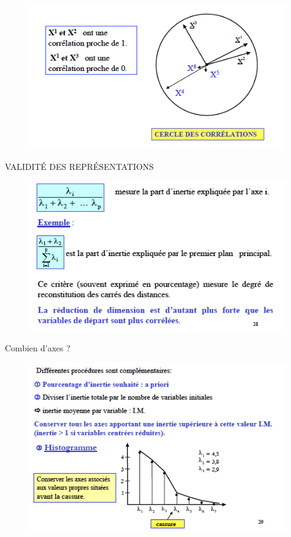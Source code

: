 \documentclass[11pt]{beamer}
\begin{document}
\begin{frame}

\begin{figure}
\includegraphics[scale=0.6]{schema21.png} 
\end{figure}

\end{frame}


\begin{frame}{VALIDITÉ DES REPRÉSENTATIONS}

\begin{figure}
\includegraphics[scale=0.6]{schema22.png} 
\end{figure}

\end{frame}


\begin{frame}{Combien d’axes ?}

\begin{figure}
\includegraphics[scale=0.6]{schema23.png} 
\end{figure}

\end{frame}
\end{document}

